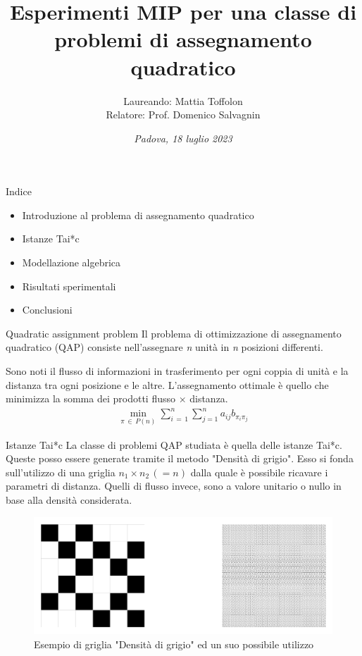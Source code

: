 \documentclass[a4paper]{beamer}
\title[title]{Esperimenti MIP per una classe di\\problemi di assegnamento quadratico}
\author[Persone]{Laureando: Mattia Toffolon\\Relatore: Prof. Domenico Salvagnin}
\date{\small \textit{Padova, 18 luglio 2023}}
\begin{document}
%
\begin{frame}
\maketitle
\end{frame}

\begin{frame}{Indice}
	\begin{itemize}
		\item Introduzione al problema di assegnamento quadratico
		\vfill
		\item Istanze Tai*c
		\vfill
		\item Modellazione algebrica
		\vfill
		\item Risultati sperimentali
		\vfill
		\item Conclusioni
		\vfill
	\end{itemize}
\end{frame}

\begin{frame}{Quadratic assignment problem}
Il problema di ottimizzazione di assegnamento quadratico (QAP) consiste nell'assegnare \textit{n} unità in 
\textit{n} posizioni differenti. 

Sono noti il flusso di informazioni in trasferimento per ogni coppia di unità 
e la distanza tra ogni posizione e le altre.
\newline \newline
L'assegnamento ottimale è quello che minimizza la somma dei prodotti flusso $\times$ distanza.
\begin{align*}
    \min_{\pi \, \in \, P(n)} \sum_{i\,=\,1}^{n} \sum_{j=1}^{n} a_{ij} b_{\pi_{i} \pi_{j}}
\end{align*}
\end{frame}

\begin{frame}{Istanze Tai*c}
La classe di problemi QAP studiata è quella delle istanze Tai*c.
\newline \newline
Queste posso essere generate tramite il metodo "Densità di grigio".
Esso si fonda sull'utilizzo di una griglia $n_1\times n_2 \,(=n)$ dalla quale è possibile ricavare i parametri di distanza.
Quelli di flusso invece, sono a valore unitario o nullo in base alla densità considerata.
\begin{figure}[h!]
    \centering
\includegraphics[scale=0.12]{images/gray_36_40.png}
\caption{Esempio di griglia "Densità di grigio" ed un suo possibile utilizzo}
\end{figure}    
\end{frame}
\end{document}
